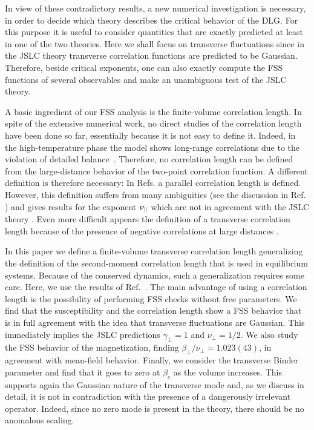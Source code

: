 \documentclass[12pt]{article}
\begin{document}
In view of these contradictory results, a new numerical investigation 
is necessary, in order to decide which theory describes the critical 
behavior of the DLG. For this purpose it
is useful to consider quantities that are exactly predicted at least in one 
of the two theories. Here we shall focus on transverse 
fluctuations since in the JSLC theory transverse correlation functions
are predicted to be Gaussian.
Therefore, beside critical exponents, one can also exactly compute 
the FSS functions of several observables
and make an unambiguous test of the JSLC theory.         

A basic ingredient of our FSS analysis is the finite-volume correlation length.
In spite of the extensive numerical work, 
no direct studies of the correlation 
length have been done so far, essentially because it is not easy to define it.
Indeed, in the high-temperature phase the model
shows long-range correlations due to the violation of detailed
balance~\cite{Garrido90,Grinstein91}. 
Therefore, no correlation length can be defined from
the large-distance behavior of the two-point correlation function. A 
different definition is therefore necessary: In Refs. \cite{Valles8687}
a parallel correlation length is defined. However, this definition suffers
from many ambiguities (see the discussion in Ref. \cite{Schmittmann95}) 
and gives results for the exponent $\nu_{\|}$ which are not in agreement 
with the JSLC theory \cite{Zhang88}. Even more difficult appears the definition
of a transverse correlation length because of the presence of negative 
correlations at large distances \cite{Zhang88,Schmittmann95}.

In this paper we define a finite-volume transverse correlation length
generalizing the definition of the second-moment correlation length that is 
used in equilibrium systems. Because of the conserved dynamics, such a 
generalization requires some care. Here, we use the results of 
Ref.~\cite{correlation_length}.
The main advantage of using a correlation length is the possibility 
of performing FSS checks without free parameters. 
We find that the susceptibility and the correlation length show a 
FSS behavior that is in full agreement with the idea that transverse 
fluctuations are Gaussian. This immediately implies the JSLC
predictions $\gamma_\bot = 1$ and $\nu_\bot=1/2$.
We also study the FSS behavior of the magnetization,
finding $\beta_\bot/\nu_\bot = 1.023(43)$, 
in agreement with mean-field behavior.
Finally, we consider the transverse Binder parameter and find that 
it goes to zero at $\beta_c$ as the volume increases. 
This supports again the Gaussian nature of the transverse mode and, 
as we discuss in detail, it 
is not in contradiction with the presence 
of a dangerously irrelevant operator. Indeed, since no zero mode is present
in the theory, there should be no anomalous scaling. 
\end{document}
